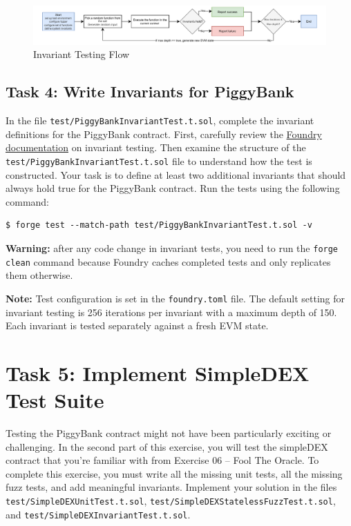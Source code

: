 \documentclass[12pt]{article}
\begin{document}
\begin{figure}[h!]
    \centering
    \includegraphics[width=1\textwidth]{invariant-testing.pdf}
    \caption{Invariant Testing Flow}\label{fig:invariant-testing}
\end{figure}

\subsection*{Task 4: Write Invariants for PiggyBank}

In the file \texttt{test/PiggyBankInvariantTest.t.sol}, complete the invariant
definitions for the PiggyBank contract. First, carefully review the
\href{https://book.getfoundry.sh/forge/invariant-testing}{Foundry
    documentation} on invariant testing. Then examine the structure of the
\texttt{test/PiggyBankInvariantTest.t.sol} file to understand how the test is
constructed. Your task is to define at least two additional invariants that
should always hold true for the PiggyBank contract. Run the tests using the
following command:

\noindent \begin{minipage}{\textwidth}
    \begin{verbatim}
$ forge test --match-path test/PiggyBankInvariantTest.t.sol -v
\end{verbatim}
\end{minipage}

\noindent
\textbf{Warning:} after any code change in invariant tests, you need to run the \texttt{forge clean} command because Foundry caches completed tests and only replicates them otherwise.

\noindent
\textbf{Note:} Test configuration is set in the \texttt{foundry.toml} file. The default setting for invariant testing is 256 iterations per invariant with a maximum depth of 150. Each invariant is tested separately against a fresh EVM state.

\section*{Task 5: Implement SimpleDEX Test Suite}

Testing the PiggyBank contract might not have been particularly exciting or
challenging. In the second part of this exercise, you will test the simpleDEX
contract that you're familiar with from Exercise 06 -- Fool The Oracle. To
complete this exercise, you must write all the missing unit tests, all the
missing fuzz tests, and add meaningful invariants. Implement your solution in
the files \texttt{test/SimpleDEXUnitTest.t.sol},
\texttt{test/SimpleDEXStatelessFuzzTest.t.sol}, and
\texttt{test/SimpleDEXInvariantTest.t.sol}.
\end{document}
